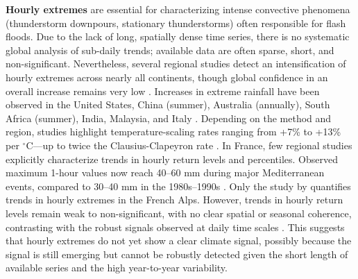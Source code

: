 \documentclass[hess, manuscript]{copernicus}
\begin{document}
\textbf{Hourly extremes} are
essential for characterizing intense convective phenomena (thunderstorm
downpours, stationary thunderstorms) often responsible for flash floods.
Due to the lack of long, spatially dense time series, there is no
systematic global analysis of sub-daily trends; available data are often
sparse, short, and non-significant. Nevertheless, several regional
studies detect an intensification of hourly extremes across nearly all
continents, though global confidence in an overall increase remains very
low \citep{IPCC2021}. Increases in extreme rainfall have been observed in the
United States, China (summer), Australia (annually), South Africa
(summer), India, Malaysia, and Italy \citep{IPCC2021}. Depending on the method and
region, studies highlight temperature-scaling rates ranging from +7\% to +13\% per
$^\circ$C---up to twice the Clausius-Clapeyron rate \citep{molnar2015relation}. In
France, few regional studies explicitly characterize trends in
hourly return levels and percentiles. Observed maximum 1-hour values now reach 40--60 mm
during major Mediterranean events, compared to 30--40 mm in the
1980s--1990s \citep{meteofrance2024}. Only the study by \cite{Berghald2025} quantifies trends in hourly extremes in the French Alps.
However, trends in hourly return levels remain weak to non-significant,
with no clear spatial or seasonal coherence, contrasting with the robust
signals observed at daily time scales \citep{Soubeyroux01022015}. This suggests that hourly extremes do not yet show a clear climate signal, possibly because the signal is still emerging but cannot be robustly detected given the short length of available series and the high year-to-year variability.
\end{document}

